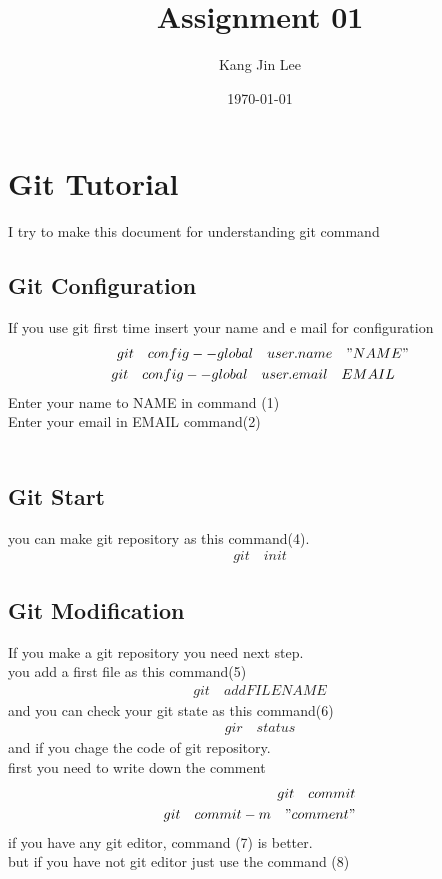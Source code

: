 \documentclass[12pt]{article}
\begin{document}
\title{Assignment 01}
\author{Kang Jin Lee}
\date{\today}
\maketitle
\section{Git Tutorial}

	I try to make this document for understanding git command
  
\subsection{Git Configuration}

	If you use git first time insert your name and e mail for configuration
\begin{align}
git \quad config --global \quad user.name \quad"NAME" \\
git \quad config -- global \quad user.email\quad  EMAIL\quad   
\end{align}
 Enter your name to NAME in command (1) \\
 Enter your email in EMAIL command(2)

\begin{align}
\end{align}



\subsection{Git Start}
       you can make git repository as this command(4).
\begin{align}
git \quad init
\end{align}


\subsection{Git Modification}
		If you make a git repository you need next step.\\
		you add a first file as this command(5)
\begin{align}
git \quad add FILENAME
\end{align}
		and you can check your git state as this command(6)
\begin{align}
gir \quad status
\end{align}
		and if you chage the code of git repository. \\
		first you need to write down the comment 
\begin{align}
git \quad commit \\
git \quad commit -m \quad "comment "
\end{align}
if you have any git editor, command (7) is better. \\
but if you have not git editor just use the command (8)
\end{document}
